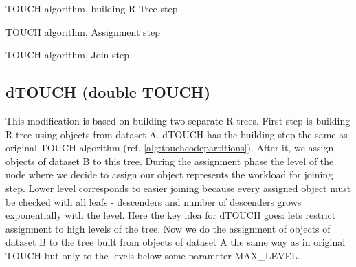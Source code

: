 \documentclass{sig-alternate}
\begin{document}
\begin{algorithm}
\caption{TOUCH algorithm, building R-Tree step}
\label{alg:touchcodepartitions}
\begin{algorithmic}[1]
    \EndFor
  \EndFor
\EndWhile
\EndFunction
\end{algorithmic}
\end{algorithm}

\begin{algorithm}
\caption{TOUCH algorithm, Assignment step}\label{touchcodeassign}
\begin{algorithmic}[1]
    \Loop
	\EndIf
	\EndIf
      \EndFor
    \EndLoop
  \EndFor
\EndFunction
\end{algorithmic}
\end{algorithm}

\begin{algorithm}
\caption{TOUCH algorithm, Join step}\label{touchcodejoin}
\begin{algorithmic}[1]
      \EndFor
    \EndIf
  \EndFor
\EndFunction
\end{algorithmic}
\end{algorithm}

\subsection{dTOUCH (double TOUCH)}
This modification is based on building two separate R-trees. First step is building R-tree using objects from dataset A. dTOUCH has the building step the same as original TOUCH algorithm (ref. \ref{alg:touchcodepartitions}). After it, we assign objects of dataset B to this tree. During the assignment phase the level of the node where we decide to assign our object represents the workload for joining step. Lower level corresponds to easier joining because every assigned object must be checked with all leafs - descenders and number of descenders grows exponentially with the level.  Here the key idea for dTOUCH goes: lets restrict assignment to high levels of the tree. Now we do the assignment of objects of dataset B to the tree built from objects of dataset A the same way as in original TOUCH but only to the levels below some parameter MAX\_LEVEL. 
\end{document}
